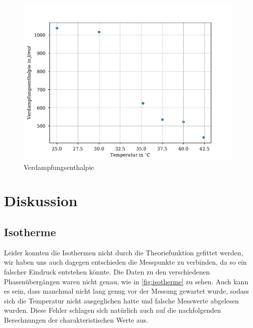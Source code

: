 \documentclass[11pt, a4paper]{article}
\begin{document}
    \begin{figure}
        \centering
        \includegraphics[width=\textwidth]{./Plots/verd.pdf}

        \caption{Verdampfungsenthalpie}
        \label{fig:verd}
    \end{figure}
    \section{Diskussion}
    \subsection{Isotherme}
    Leider konnten die Isothermen nicht durch die Theoriefunktion gefittet werden, wir haben uns auch dagegen entschieden die 
    Messpunkte zu verbinden, da so ein falscher Eindruck entstehen könnte. Die Daten zu den verschiedenen Phasenübergängen waren 
    nicht genau, wie in \ref{fig:isotherme} zu sehen. Auch kann es sein, dass manchmal nicht lang genug vor der 
    Messung gewartet wurde, sodass sich die Temperatur nicht ausgeglichen hatte und falsche Messwerte abgelesen wurden.
    Diese Fehler schlagen sich natürlich auch auf die nachfolgenden Berechnungen der charakteristischen Werte aus.
\end{document}
